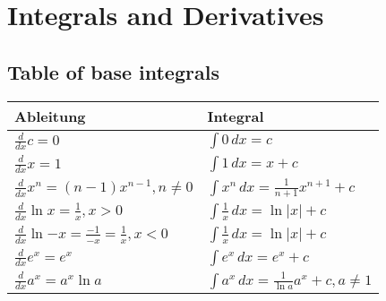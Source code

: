 \section*{Integrals and Derivatives}

\subsection*{Table of base integrals}
\bgroup
    \def\arraystretch{1.3}
    \begin{longtable}{ll}
        \toprule
        Ableitung & Integral \\
        \hline
        \midrule

        \endhead
        \endfoot
        \endlastfoot

        $\frac{d}{dx} c = 0$ &
        $\int 0\,dx = c$
        \\
        $\frac{d}{dx} x = 1$ &
        $\int 1\,dx = x + c$
        \\
        $\frac{d}{dx} x^n = (n-1)x^{n-1}, n\not=0$ &
        $\int x^n\,dx = \frac{1}{n+1} x^{n+1} + c$
        \\
        $\frac{d}{dx} \ln{x} = \frac{1}{x}, x > 0$ &
        $\int \frac{1}{x}\,dx = \ln|x| + c$
        \\
        $\frac{d}{dx} \ln{-x} = \frac{-1}{-x} = \frac{1}{x}, x < 0$ &
        $\int \frac{1}{x}\,dx = \ln|x| + c$
        \\

        \midrule
        $\frac{d}{dx} e^x = e^x$ &
        $\int e^x\,dx = e^x + c$
        \\
        $\frac{d}{dx} a^x = a^x \ln{a}$ &
        $\int a^x\,dx = \frac{1}{\ln{a}} a^x + c, a \neq 1$
        \\


\end{longtable}
